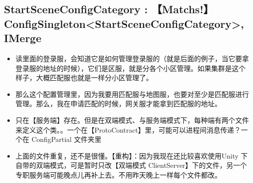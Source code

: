 \documentclass[9pt, b5paper]{article}
\begin{document}
\subsection{StartSceneConfigCategory : 【Matchs!】ConfigSingleton<StartSceneConfigCategory>, IMerge}
\label{sec-1-8}
\begin{itemize}
\item 读里面的登录服，会知道它是如何管理登录服的（就是后面的例子，当它要拿登录服的地址的时候），它们是区服，就是分各个小区管理。如果集群是这个样子，大概匹配服也就是一样分小区管理了。
\item 那么这个配置管理里，因为我要用匹配服与地图服，也要对至少是匹配服进行管理。那么，我在申请匹配的时候，网关服才能拿到匹配服的地址。
\item 只在【服务端】存在。但是在双端模式、与服务端模式下，每种端有两个文件来定义这个类。。一个在【ProtoContract】里，可能可以进程间消息传递？一个在 ConfigPartial 文件夹里
\item 上面的文件重复，还不是很懂。【重构】：因为我现在还比较喜欢使用Unity 下自带的双端模式，可是暂时只改【双端模式 ClientServer】下的文件，另一个专职服务端可能晚点儿再补上去。不用昨天晚上一样每个文件都改。
\end{itemize}
\end{document}

